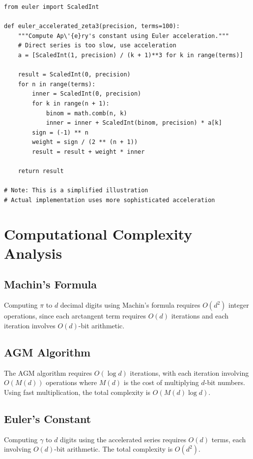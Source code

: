 \begin{lstlisting}[caption={Euler acceleration for zeta(3)}, label=lst:euler_accel_zeta3]
from euler import ScaledInt

def euler_accelerated_zeta3(precision, terms=100):
    """Compute Ap\'{e}ry's constant using Euler acceleration."""
    # Direct series is too slow, use acceleration
    a = [ScaledInt(1, precision) / (k + 1)**3 for k in range(terms)]
    
    result = ScaledInt(0, precision)
    for n in range(terms):
        inner = ScaledInt(0, precision)
        for k in range(n + 1):
            binom = math.comb(n, k)
            inner = inner + ScaledInt(binom, precision) * a[k]
        sign = (-1) ** n
        weight = sign / (2 ** (n + 1))
        result = result + weight * inner
    
    return result

# Note: This is a simplified illustration
# Actual implementation uses more sophisticated acceleration
\end{lstlisting}

\section{Computational Complexity Analysis}

\subsection{Machin's Formula}

Computing $\pi$ to $d$ decimal digits using Machin's formula requires $O(d^2)$ integer operations,
since each arctangent term requires $O(d)$ iterations and each iteration involves $O(d)$-bit arithmetic.

\subsection{AGM Algorithm}

The AGM algorithm requires $O(\log d)$ iterations, with each iteration involving $O(M(d))$ operations
where $M(d)$ is the cost of multiplying $d$-bit numbers. Using fast multiplication, the total
complexity is $O(M(d) \log d)$.

\subsection{Euler's Constant}

Computing $\gamma$ to $d$ digits using the accelerated series requires $O(d)$ terms,
each involving $O(d)$-bit arithmetic. The total complexity is $O(d^2)$.

